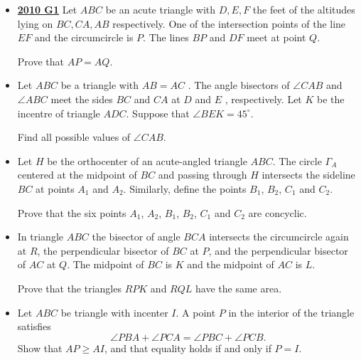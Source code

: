 \documentclass[11pt]{scrartcl}
\begin{document}
\begin{itemize}[leftmargin=*]
Prove that the circumcircle of $ABC$ and $\omega$ meet at two points.

\newpage

\item \href{https://artofproblemsolving.com/community/c6h418633p2361970}{\textbf{2010 G1}} Let $ABC$ be an acute triangle with $D, E, F$ the feet of the altitudes lying on $BC, CA, AB$ respectively. One of the intersection points of the line $EF$ and the circumcircle is $P.$ The lines $BP$ and $DF$ meet at point $Q.$ 

Prove that $AP = AQ.$
\item {}  Let $ ABC$ be a triangle with $ AB = AC$ . The angle bisectors of $ \angle C AB$ and $ \angle AB C$ meet the sides $ B C$ and $ C A$ at $ D$ and $ E$ , respectively. Let $ K$ be the incentre of triangle $ ADC$. Suppose that $ \angle B E K = 45^\circ$. 

Find all possible values of $ \angle CAB$.

\item {}  Let $ H$ be the orthocenter of an acute-angled triangle $ ABC$. The circle $ \Gamma_{A}$ centered at the midpoint of $ BC$ and passing through $ H$ intersects the sideline $ BC$ at points $ A_{1}$ and $ A_{2}$. Similarly, define the points $ B_{1}$, $ B_{2}$, $ C_{1}$ and $ C_{2}$. 

Prove that the six points $ A_{1}$, $ A_{2}$, $ B_{1}$, $ B_{2}$, $ C_{1}$ and $ C_{2}$ are concyclic.
\item {}  In triangle $ ABC$ the bisector of angle $ BCA$ intersects the circumcircle again at $ R$, the perpendicular bisector of $ BC$ at $ P$, and the perpendicular bisector of $ AC$ at $ Q$. The midpoint of $ BC$ is $ K$ and the midpoint of $ AC$ is $ L$. 

Prove that the triangles $ RPK$ and $ RQL$ have the same area.
\item {}  Let $ABC$ be triangle with incenter $I$. A point $P$ in the interior of the triangle satisfies\[\angle PBA+\angle PCA = \angle PBC+\angle PCB.\]Show that $AP \geqslant  AI$, and that equality holds if and only if $P=I$.
\end{itemize}
\newpage
\end{document}
